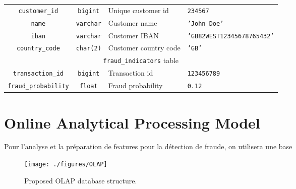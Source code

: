 \documentclass[11pt,a4paper,computermodern]{article}
\newcommand{\code}{\texttt}
\begin{document}
\begin{table}[ht]
\begin{threeparttable}
\begin{tabularx}{0.99\textwidth}{c c >{\centering\arraybackslash}X >{\centering\arraybackslash}X}
			\code{customer\_id} & \code{bigint} & Unique customer id & \code{234567} \\
			\code{name} & \code{varchar} & Customer name & \code{'John Doe'} \\
			\code{iban} & \code{varchar} & Customer IBAN & \code{'GB82WEST12345678765432'} \\
			\code{country\_code} & \code{char(2)} & Customer country code  & \code{'GB'} \\
			\midrule
			\multicolumn{4}{c}{\code{fraud\_indicators} table}\\
			\code{transaction\_id} & \code{bigint} & Transaction id & \code{123456789} \\
			\code{fraud\_probability} & \code{float} & Fraud probability & \code{0.12} \\
			\bottomrule
		\end{tabularx}
	\end{threeparttable}
\end{table}


\section*{Online Analytical Processing Model}

Pour l'analyse et la préparation de features pour la détection de fraude, on utilisera une base 


\begin{figure}
	\centering
	\texttt{[image: ./figures/OLAP]}
	\caption{Proposed OLAP database structure.}
	\label{fig:OLAP}
\end{figure}
\end{document}
